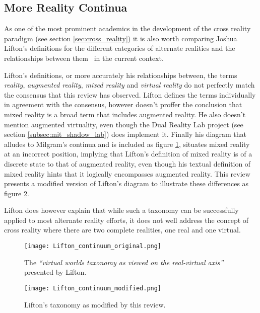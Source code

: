 \subsection{More Reality Continua}
As one of the most prominent academics in the development of the cross reality paradigm (see section \ref{sec:cross_reality}) it is also worth comparing Joshua Lifton's definitions for the different categories of alternate realities and the relationships between them~\cite{Lifton2007a} in the current context.

Lifton's definitions, or more accurately his relationships between, the terms \textit{reality}, \textit{augmented reality}, \textit{mixed reality} and \textit{virtual reality} do not perfectly match the consensus that this review has observed. Lifton defines the terms individually in agreement with the consensus, however doesn't proffer the conclusion that mixed reality is a broad term that includes augmented reality. He also doesn't mention augmented virtuality, even though the Dual Reality Lab project (see section \ref{subsec:mit_shadow_lab}) does implement it. Finally his diagram that alludes to Milgram's continua and is included as figure \ref{original_lifton_axis.png}, situates mixed reality at an incorrect position, implying that Lifton's definition of mixed reality is of a discrete state to that of augmented reality, even though his textual definition of mixed reality hints that it logically encompasses augmented reality. This review presents a modified version of Lifton's diagram to illustrate these differences as figure \ref{modified_lifton_axis.png}.

Lifton does however explain that while such a taxonomy can be successfully applied to most alternate reality efforts, it does not well address the concept of cross reality where there are two complete realities, one real and one virtual.

\begin{figure}[h]
	\centering
	\texttt{[image: Lifton\_continuum\_original.png]}
	\caption{The \textit{``virtual worlds taxonomy as viewed on the real-virtual axis''} presented by Lifton.}
	\label{original_lifton_axis.png}
\end{figure}

\begin{figure}[h]
	\centering
	\texttt{[image: Lifton\_continuum\_modified.png]}
	\caption{Lifton's taxonomy as modified by this review.}
	\label{modified_lifton_axis.png}
\end{figure}

